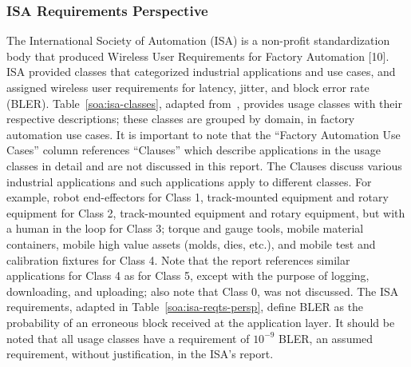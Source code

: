 \subsubsection{ISA Requirements Perspective}\label{sec:litreview:isa}

The International Society of Automation (ISA) is a non-profit standardization body that produced Wireless User Requirements for Factory Automation [10]. ISA provided classes that categorized industrial applications and use cases, and assigned wireless user requirements for latency, jitter, and block error rate (BLER). Table~\ref{soa:isa-classes}, adapted from~\cite{ISATR100-2011}, provides usage classes with their respective descriptions; these classes are grouped by domain, in factory automation use cases. It is important to note that the “Factory Automation Use Cases” column references “Clauses” which describe applications in the usage classes in detail and are not discussed in this report. The Clauses discuss various industrial applications and such applications apply to different classes. For example, robot end-effectors for Class 1, track-mounted equipment and rotary equipment for Class 2, track-mounted equipment and rotary equipment, but with a human in the loop for Class 3; torque and gauge tools, mobile material containers, mobile high value assets (molds, dies, etc.), and mobile test and calibration fixtures for Class 4. Note that the report references similar applications for Class 4 as for Class 5, except with the purpose of logging, downloading, and uploading; also note that Class 0, was not discussed. The ISA requirements, adapted in Table~\ref{soa:isa-reqts-persp}, define BLER as the probability of an erroneous block received at the application layer. It should be noted that all usage classes have a requirement of $10^{-9}$ BLER, an assumed requirement, without justification, in the ISA’s report. 

